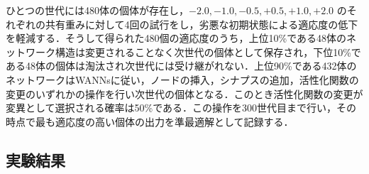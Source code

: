 ひとつの世代には480体の個体が存在し，$ -2.0, -1.0, -0.5, +0.5, +1.0, +2.0$ のそれぞれの共有重みに対して4回の試行をし，劣悪な初期状態による適応度の低下を軽減する．そうして得られた480個の適応度のうち，上位10\%である48体のネットワーク構造は変更されることなく次世代の個体として保存され，下位10\%である48体の個体は淘汰され次世代には受け継がれない．上位90\%である432体のネットワークはWANNsに従い，ノードの挿入，シナプスの追加，活性化関数の変更のいずれかの操作を行い次世代の個体となる．このとき活性化関数の変更が変異として選択される確率は50\%である．この操作を300世代目まで行い，その時点で最も適応度の高い個体の出力を準最適解として記録する．

\subsection{実験結果}
